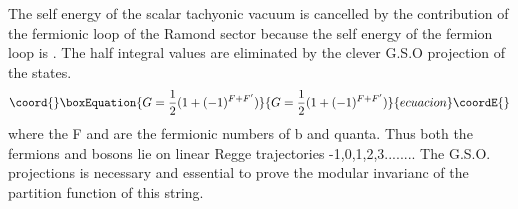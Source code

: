 \documentclass[a4paper,showpacs,preprintnumbers,amsmath,amssymb]{revtex4}
\begin{document}
The self energy of the scalar tachyonic vacuum is cancelled by the contribution 
of the fermionic loop of the Ramond sector because the self energy of the fermion 
loop is \coordHE{}.
 The half integral values are 
eliminated by the clever G.S.O projection of the states.
\begin{equation}\coord{}\boxEquation{
G=\frac{1}{2}(1+(-1)^{F+F'})
}{
G=\frac{1}{2}(1+(-1)^{F+F'})
}{ecuacion}\coordE{}\end{equation}
where the F and \coordHE{} are the fermionic numbers of b and \coordHE{} quanta. Thus both 
the fermions and bosons lie on linear Regge trajectories \coordHE{} -1,0,1,2,3........ 
The G.S.O. projections is necessary and essential to prove the modular
invarianc of the partition function of this string. 
\end{document}
